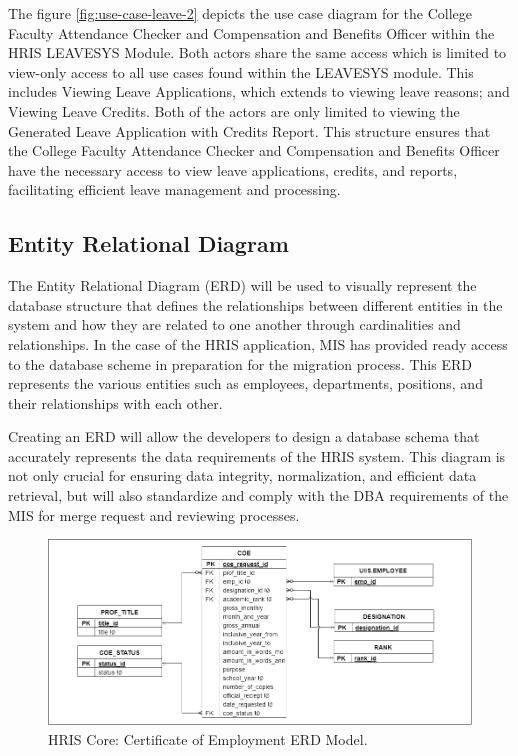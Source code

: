     The figure \ref{fig:use-case-leave-2} depicts the use case diagram for the College Faculty Attendance Checker and Compensation and Benefits Officer within the HRIS LEAVESYS Module. Both actors share the same access which is limited to view-only access to all use cases found within the LEAVESYS module. This includes Viewing Leave Applications, which extends to viewing leave reasons; and Viewing Leave Credits. Both of the actors are only limited to viewing the Generated Leave Application with Credits Report. This structure ensures that the College Faculty Attendance Checker and Compensation and Benefits Officer have the necessary access to view leave applications, credits, and reports, facilitating efficient leave management and processing.


    \subsection{Entity Relational Diagram}
    
    The Entity Relational Diagram (ERD) will be used to visually represent the database structure that defines the relationships between different entities in the system and how they are related to one another through cardinalities and relationships. In the case of the HRIS application, MIS has provided ready access to the database scheme in preparation for the migration process. This ERD represents the various entities such as employees, departments, positions, and their relationships with each other. 
    
    Creating an ERD will allow the developers to design a database schema that accurately represents the data requirements of the HRIS system. This diagram is not only crucial for ensuring data integrity, normalization, and efficient data retrieval, but will also standardize and comply with the DBA requirements of the MIS for merge request and reviewing processes.

    \begin{figure}[H]
        \centering
        \includegraphics[width=1\linewidth]{figures/images/diagrams/erd/erd-core-coe.png}
        \caption{HRIS Core: Certificate of Employment ERD Model.}
        \label{fig:erd-core-coe} 
    \end{figure}

